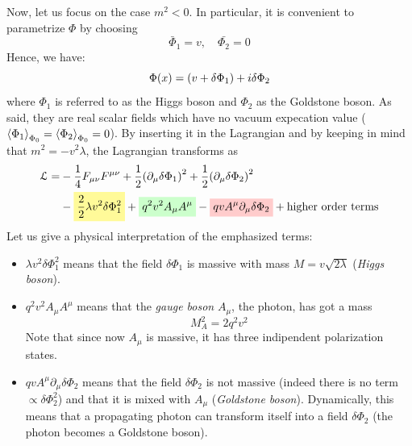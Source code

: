 \documentclass[../../Main/Main.tex]{subfiles}
\begin{document}
Now, let us focus on  the case \( m^2<0 \). In particular, it is convenient to parametrize \( \Phi  \) by choosing
\begin{equation*}
  \bar{\Phi }_1 = v , \quad \bar{\Phi _2} = 0
\end{equation*}
Hence, we have:
\begin{equation*}
  \Phi (x) = \qty(v + \delta \Phi _1) + i \delta \Phi _2
\end{equation*}
where \( \Phi _1 \) is referred to as the Higgs boson and \( \Phi _2 \) as the Goldstone boson. As said, they are real scalar fields which have no vacuum expecation value (\( \expval{\Phi _1}_{\Phi _0} = \expval{\Phi _2}_{\Phi _0} = 0   \)).
By inserting it in the Lagrangian and by keeping in mind that \(  m^2 = -v^2 \lambda  \), the Lagrangian transforms as
\begin{equation}
\begin{split}
  \mathcal{L} = & - \frac{1}{4} F_ {\mu \nu }F ^{\mu \nu } + \frac{1}{2} \qty(\partial_ \mu \delta \Phi _1 )^2 + \frac{1}{2} \qty(\partial _ \mu \delta \Phi _2 )^2    \\
  & -\mathcolorbox{yellow!40}{\frac{2}{2} \lambda v^2 \delta \Phi _1 ^2} + \mathcolorbox{green!20}{q^2 v^2 A_{\mu } A ^{\mu }} - \mathcolorbox{red!20}{q v A ^{\mu } \partial_ \mu \delta \Phi _2} + \text{higher order terms}
\end{split}
\label{eq:n_9}
\end{equation}
Let us give a physical interpretation of the emphasized terms:
\begin{itemize}
\item \( \lambda v^2 \delta \Phi _1^2 \) means that the field \( \delta \Phi _1 \) is massive with mass \( M = v \sqrt{2 \lambda }  \)  (\emph{Higgs boson}).

\item \( q^2 v^2 A_ \mu A ^\mu  \) means that the \emph{gauge boson}  \( A _ \mu  \), the photon, has got a mass
\begin{equation*}
  M_A^2 = 2 q^2 v^2
\end{equation*}
Note that since now \( A _ \mu  \) is massive, it has three indipendent polarization states.

\item \( q v A ^ \mu  \partial _ \mu  \delta \Phi _2  \) means that the field \( \delta \Phi _2 \) is not massive (indeed there is no term \( \propto \delta \Phi _2^2 \)) and that it is mixed with \( A_ \mu  \) (\emph{Goldstone boson}). Dynamically, this means that a propagating photon can transform itself into a field \( \delta \Phi _2 \) (the photon becomes a Goldstone boson).

\end{itemize}
\end{document}
